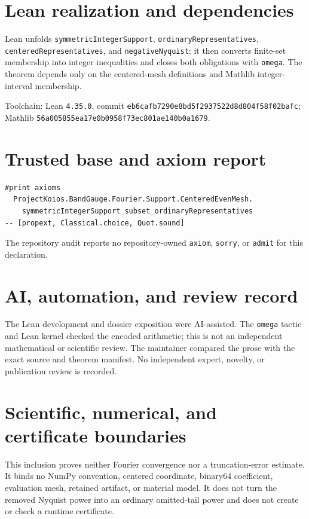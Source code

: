 \documentclass[11pt]{article}
\begin{document}
\section{Lean realization and dependencies}
Lean unfolds \texttt{symmetricIntegerSupport}, \texttt{ordinaryRepresentatives},
\texttt{centeredRepresentatives}, and \texttt{negativeNyquist}; it then converts finite-set
membership into integer inequalities and closes both obligations with \texttt{omega}.  The theorem
depends only on the centered-mesh definitions and Mathlib integer-interval membership.

Toolchain: Lean \texttt{4.35.0}, commit
\texttt{eb6cafb7290e8bd5f2937522d8d804f58f02bafc}; Mathlib
\texttt{56a005855ea17e0b0958f73ec801ae140b0a1679}.

\section{Trusted base and axiom report}
\begin{verbatim}
#print axioms
  ProjectKoios.BandGauge.Fourier.Support.CenteredEvenMesh.
    symmetricIntegerSupport_subset_ordinaryRepresentatives
-- [propext, Classical.choice, Quot.sound]
\end{verbatim}
The repository audit reports no repository-owned \texttt{axiom}, \texttt{sorry}, or
\texttt{admit} for this declaration.

\section{AI, automation, and review record}
The Lean development and dossier exposition were AI-assisted.  The \texttt{omega} tactic and Lean
kernel checked the encoded arithmetic; this is not an independent mathematical or scientific
review.  The maintainer compared the prose with the exact source and theorem manifest.  No
independent expert, novelty, or publication review is recorded.

\section{Scientific, numerical, and certificate boundaries}
This inclusion proves neither Fourier convergence nor a truncation-error estimate.  It binds no
NumPy convention, centered coordinate, binary64 coefficient, evaluation mesh, retained artifact,
or material model.  It does not turn the removed Nyquist power into an ordinary omitted-tail power
and does not create or check a runtime certificate.
\end{document}

